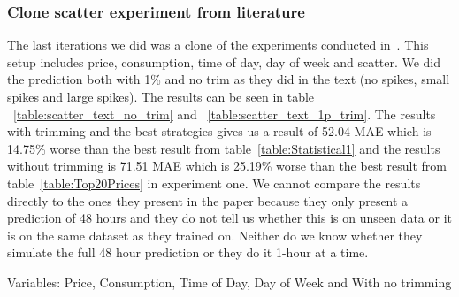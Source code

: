\subsubsection{Clone scatter experiment from literature}
The last iterations we did was a clone of the experiments conducted in~\cite{singhal2011electricity}. This setup includes price, consumption, time of day, day of week and scatter. We did the prediction both with 1\% and no trim as they did in the text (no spikes, small spikes and large spikes). The results can be seen in table ~\ref{table:scatter_text_no_trim} and ~\ref{table:scatter_text_1p_trim}. The results with trimming and the best strategies gives us a result of 52.04 MAE which is 14.75\% worse than the best result from table~\ref{table:Statistical1} and the results without trimming is 71.51 MAE which is 25.19\% worse than the best result from table~\ref{table:Top20Prices} in experiment one. We cannot compare the results directly to the ones they present in the paper because they only present a prediction of 48 hours and they do not tell us whether this is on unseen data or it is on the same dataset as they trained on. Neither do we know whether they simulate the full 48 hour prediction or they do it 1-hour at a time.

Variables: Price, Consumption, Time of Day, Day of Week and With no trimming
\begin{table}[H]
\centering  %
\caption{Scatter text~\cite{singhal2011electricity} with other calculated inputs and no trim} %
\label{table:scatter_text_no_trim} %
\end{table}

